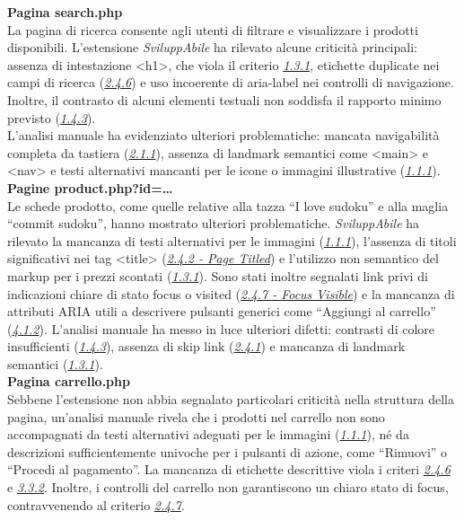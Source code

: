\noindent \textbf{Pagina search.php}\\
La pagina di ricerca consente agli utenti di filtrare e visualizzare i prodotti disponibili. 
L’estensione \textit{SviluppAbile} ha rilevato alcune criticità principali: assenza di intestazione <h1>, che viola il criterio {\hyperref[wcag:1.3.1]{\textit{1.3.1}}}, etichette duplicate nei campi di ricerca ({\hyperref[wcag:2.4.6]{\textit{2.4.6}}}) e uso incoerente di aria-label nei controlli di navigazione. Inoltre, il contrasto di alcuni elementi testuali non soddisfa il rapporto minimo previsto ({\hyperref[wcag:1.4.3]{\textit{1.4.3}}}).\\
L’analisi manuale ha evidenziato ulteriori problematiche: mancata navigabilità completa da tastiera ({\hyperref[wcag:2.1.1]{\textit{2.1.1}}}), assenza di landmark semantici come <main> e <nav> e testi alternativi mancanti per le icone o immagini illustrative ({\hyperref[wcag:1.1.1]{\textit{1.1.1}}}).\\

\noindent \textbf{Pagine product.php?id=…}\\
Le schede prodotto, come quelle relative alla tazza “I love sudoku” e alla maglia “commit sudoku”, hanno mostrato ulteriori problematiche. \textit{SviluppAbile} ha rilevato la mancanza di testi alternativi per le immagini ({\hyperref[wcag:1.1.1]{\textit{1.1.1}}}), l’assenza di titoli significativi nei tag <title> ({\hyperref[wcag:2.4.2]{\textit{2.4.2 - Page Titled}}}) e l’utilizzo non semantico del markup per i prezzi scontati ({\hyperref[wcag:1.3.1]{\textit{1.3.1}}}). Sono stati inoltre segnalati link privi di indicazioni chiare di stato focus o visited ({\hyperref[wcag:2.4.7]{\textit{2.4.7 - Focus Visible}}}) e la mancanza di attributi ARIA utili a descrivere pulsanti generici come “Aggiungi al carrello” ({\hyperref[wcag:4.1.2]{\textit{4.1.2}}}).
L’analisi manuale ha messo in luce ulteriori difetti: contrasti di colore insufficienti ({\hyperref[wcag:1.4.3]{\textit{1.4.3}}}), assenza di skip link ({\hyperref[wcag:2.4.1]{\textit{2.4.1}}}) e mancanza di landmark semantici ({\hyperref[wcag:1.3.1]{\textit{1.3.1}}}).\\

\noindent \textbf{Pagina carrello.php}\\
Sebbene l’estensione non abbia segnalato particolari criticità nella struttura della pagina, un’analisi manuale rivela che i prodotti nel carrello non sono accompagnati da testi alternativi adeguati per le immagini ({\hyperref[wcag:1.1.1]{\textit{1.1.1}}}), né da descrizioni sufficientemente univoche per i pulsanti di azione, come “Rimuovi” o “Procedi al pagamento”. La mancanza di etichette descrittive viola i criteri {\hyperref[wcag:2.4.6]{\textit{2.4.6}}} e {\hyperref[wcag:3.3.2]{\textit{3.3.2}}}. Inoltre, i controlli del carrello non garantiscono un chiaro stato di focus, contravvenendo al criterio {\hyperref[wcag:2.4.7]{\textit{2.4.7}}}.\\

